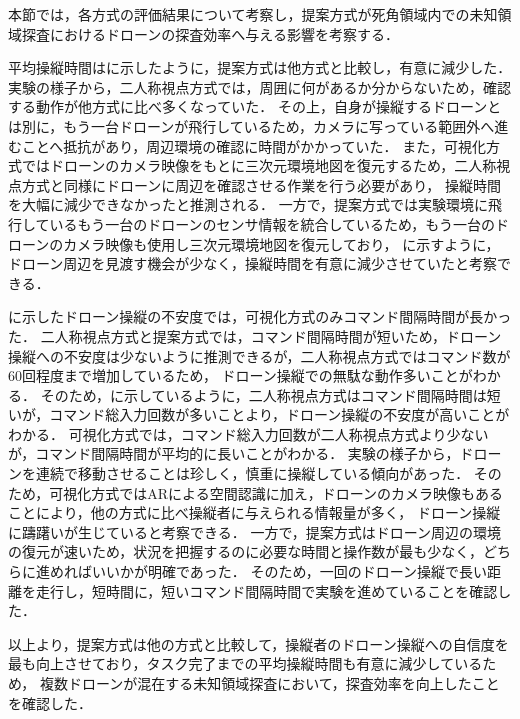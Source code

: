\documentclass[a4paper,11pt]{ujreport}
\begin{document}
本節では，各方式の評価結果について考察し，提案方式が死角領域内での未知領域探査におけるドローンの探査効率へ与える影響を考察する．
\par
平均操縦時間はに示したように，提案方式は他方式と比較し，有意に減少した．
実験の様子から，二人称視点方式では，周囲に何があるか分からないため，確認する動作が他方式に比べ多くなっていた．
その上，自身が操縦するドローンとは別に，もう一台ドローンが飛行しているため，カメラに写っている範囲外へ進むことへ抵抗があり，周辺環境の確認に時間がかかっていた．
また，可視化方式ではドローンのカメラ映像をもとに三次元環境地図を復元するため，二人称視点方式と同様にドローンに周辺を確認させる作業を行う必要があり，
操縦時間を大幅に減少できなかったと推測される．
一方で，提案方式では実験環境に飛行しているもう一台のドローンのセンサ情報を統合しているため，もう一台のドローンのカメラ映像も使用し三次元環境地図を復元しており，
に示すように，ドローン周辺を見渡す機会が少なく，操縦時間を有意に減少させていたと考察できる．
\par
{}に示したドローン操縦の不安度では，可視化方式のみコマンド間隔時間が長かった．
二人称視点方式と提案方式では，コマンド間隔時間が短いため，ドローン操縦への不安度は少ないように推測できるが，二人称視点方式ではコマンド数が60回程度まで増加しているため，
ドローン操縦での無駄な動作多いことがわかる．
そのため，に示しているように，二人称視点方式はコマンド間隔時間は短いが，コマンド総入力回数が多いことより，ドローン操縦の不安度が高いことがわかる．
可視化方式では，コマンド総入力回数が二人称視点方式より少ないが，コマンド間隔時間が平均的に長いことがわかる．
実験の様子から，ドローンを連続で移動させることは珍しく，慎重に操縦している傾向があった．
そのため，可視化方式ではARによる空間認識に加え，ドローンのカメラ映像もあることにより，他の方式に比べ操縦者に与えられる情報量が多く，
ドローン操縦に躊躇いが生じていると考察できる．
一方で，提案方式はドローン周辺の環境の復元が速いため，状況を把握するのに必要な時間と操作数が最も少なく，どちらに進めればいいかが明確であった．
そのため，一回のドローン操縦で長い距離を走行し，短時間に，短いコマンド間隔時間で実験を進めていることを確認した．

以上より，提案方式は他の方式と比較して，操縦者のドローン操縦への自信度を最も向上させており，タスク完了までの平均操縦時間も有意に減少しているため，
複数ドローンが混在する未知領域探査において，探査効率を向上したことを確認した．
\end{document}
